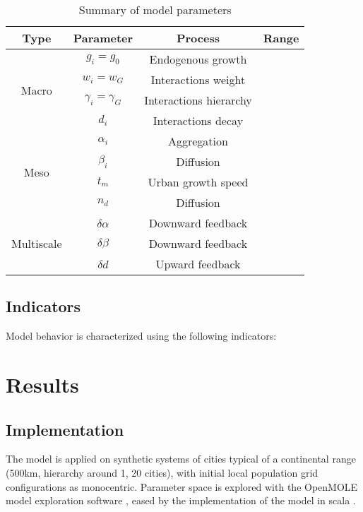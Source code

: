 \documentclass[11pt]{article}
\begin{document}
\begin{table}
	\caption{Summary of model parameters\label{tab:parameters}}
	\centering
	\begin{tabular}{|c|c|c|c|}
	\hline
		Type & Parameter & Process & Range \\\hline
		\multirow{4}{*}{Macro} & $g_i = g_0$ & Endogenous growth & \\
		& $w_i = w_G$ & Interactions weight & \\
		& $\gamma_i = \gamma_G$ & Interactions hierarchy & \\
		& $d_i$ & Interactions decay & \\ \hline
		\multirow{4}{*}{Meso} & $\alpha_i$ & Aggregation & \\
		& $\beta_i$ & Diffusion & \\
		& $t_m$ & Urban growth speed & \\
		& $n_d$ & Diffusion & \\ \hline
		\multirow{3}{*}{Multiscale} & $\delta\alpha$ & Downward feedback & \\
		& $\delta\beta$ & Downward feedback & \\
		& $\delta d$ & Upward feedback & \\\hline
	\end{tabular}
\end{table}




\subsection{Indicators}

Model behavior is characterized using the following indicators:




\section{Results}

\subsection{Implementation}

The model is applied on synthetic systems of cities typical of a continental range (500km, hierarchy around 1, 20 cities), with initial local population grid configurations as monocentric. Parameter space is explored with the OpenMOLE model exploration software \cite{reuillon2013openmole}, eased by the implementation of the model in scala \cite{model}.
\end{document}

